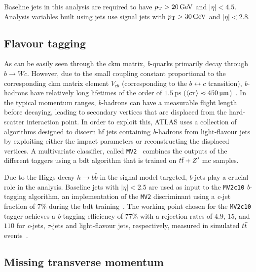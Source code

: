 Baseline jets in this analysis are required to have $\pt > \SI{20}{\GeV}$ and $\vert\eta\vert < 4.5$. Analysis variables built using jets use signal jets with $\pt > \SI{30}{\GeV}$ and $\vert\eta\vert < 2.8$.

\subsection{Flavour tagging}\label{sec:flavour_tagging}

As can be easily seen through the \gls{ckm} matrix, \textit{b}-quarks primarily decay through $b\rightarrow W c$. However, due to the small coupling constant proportional to the corresponding \gls{ckm} matrix element $V_{cb}$ (corresponding to the $b \leftrightarrow c $ transition), \textit{b}-hadrons have relatively long lifetimes of the order of $\SI{1.5}{\pico\second}$ ($\braket{c\tau} \approx \SI{450}{\micro\meter}$)~\cite{pdg2020}. In the typical momentum ranges, \textit{b}-hadrons can have a measurable flight length before decaying, leading to secondary vertices that are displaced from the hard-scatter interaction point. In order to exploit this, ATLAS uses a collection of algorithms designed to discern \gls{hf} jets containing \textit{b}-hadrons from light-flavour jets by exploiting either the impact parameters or reconstructing the displaced vertices. A multivariate classifier, called \texttt{MV2}~\cite{ATL-PHYS-PUB-2017-013} combines the outputs of the different taggers using a \gls{bdt} algorithm that is trained on $t\bar{t} + Z'$ \gls{mc} samples. 

Due to the Higgs decay $h\rightarrow b\bar{b}$ in the signal model targeted, \textit{b}-jets play a crucial role in the analysis. Baseline jets with $\vert\eta\vert < 2.5$ are used as input to the \texttt{MV2c10} \textit{b}-tagging algorithm, an implementation of the \texttt{MV2} discriminant using a \textit{c}-jet fraction of 7\% during the \gls{bdt} training~\cite{FTAG-2018-01, PERF-2016-05}. The working point chosen for the \texttt{MV2c10} tagger achieves a \textit{b}-tagging efficiency of 77\% with a rejection rates of $4.9$, $15$, and $110$ for \textit{c}-jets, $\tau$-jets and light-flavour jets, respectively, measured in simulated $t\bar{t}$ events~\cite{FTAG-2018-01}.

\subsection{Missing transverse momentum}

